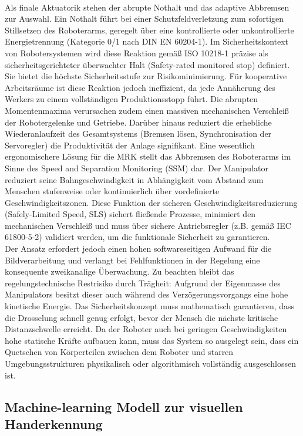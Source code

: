 \\Als finale Aktuatorik stehen der abrupte Nothalt und das adaptive Abbremsen zur Auswahl. Ein Nothalt führt bei einer Schutzfeldverletzung zum sofortigen Stillsetzen des Roboterarms, geregelt über eine kontrollierte oder unkontrollierte Energietrennung (Kategorie 0/1 nach DIN EN 60204-1). Im Sicherheitskontext von Robotersystemen wird diese Reaktion gemäß ISO 10218-1 präzise als sicherheitsgerichteter überwachter Halt (Safety-rated monitored stop) definiert. Sie bietet die höchste Sicherheitsstufe zur Risikominimierung. Für kooperative Arbeitsräume ist diese Reaktion jedoch ineffizient, da jede Annäherung des Werkers zu einem vollständigen Produktionsstopp führt. Die abrupten Momentenmaxima verursachen zudem einen massiven mechanischen Verschleiß der Robotergelenke und Getriebe. Darüber hinaus reduziert die erhebliche Wiederanlaufzeit des Gesamtsystems (Bremsen lösen, Synchronisation der Servoregler) die Produktivität der Anlage signifikant. Eine wesentlich ergonomischere Lösung für die MRK stellt das Abbremsen des Roboterarms im Sinne des Speed and Separation Monitoring (SSM) dar. Der Manipulator reduziert seine Bahngeschwindigkeit in Abhängigkeit vom Abstand zum Menschen stufenweise oder kontinuierlich über vordefinierte Geschwindigkeitszonen. Diese Funktion der sicheren Geschwindigkeitsreduzierung (Safely-Limited Speed, SLS) sichert fließende Prozesse, minimiert den mechanischen Verschleiß und muss über sichere Antriebsregler (z.B. gemäß IEC 61800-5-2) validiert werden, um die funktionale Sicherheit zu garantieren. 
\\Der Ansatz erfordert jedoch einen hohen softwareseitigen Aufwand für die Bildverarbeitung und verlangt bei Fehlfunktionen in der Regelung eine konsequente zweikanalige Überwachung. Zu beachten bleibt das regelungstechnische Restrisiko durch Trägheit: Aufgrund der Eigenmasse des Manipulators besitzt dieser auch während des Verzögerungsvorgangs eine hohe kinetische Energie. Das Sicherheitskonzept muss mathematisch garantieren, dass die Drosselung schnell genug erfolgt, bevor der Mensch die nächste kritische Distanzschwelle erreicht. Da der Roboter auch bei geringen Geschwindigkeiten hohe statische Kräfte aufbauen kann, muss das System so ausgelegt sein, dass ein Quetschen von Körperteilen zwischen dem Roboter und starren Umgebungsstrukturen physikalisch oder algorithmisch vollständig ausgeschlossen ist.

\subsection{Machine-learning Modell zur visuellen Handerkennung}
